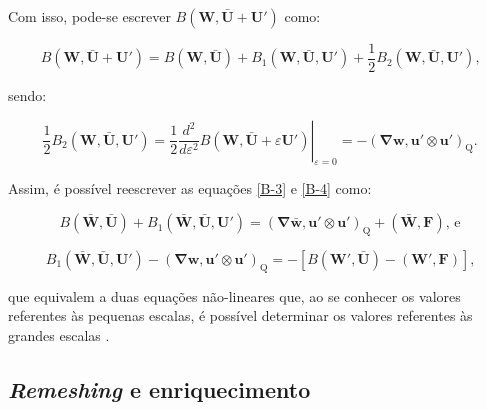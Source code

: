 \documentclass[_ArquivoPrincipal.tex]{subfiles}
\begin{document}
Com isso, pode-se escrever $B(\mathbf{W},\bar{\mathbf{U}}+\mathbf{U}')$ como:

\begin{equation}
    B(\mathbf{W},\bar{\mathbf{U}}+\mathbf{U}')=B(\mathbf{W},\bar{\mathbf{U}})+B_1(\mathbf{W},\bar{\mathbf{U}},\mathbf{U}')+\frac{1}{2}B_2(\mathbf{W},\bar{\mathbf{U}},\mathbf{U}')\text{,}
    \label{B-5}
\end{equation}

\noindent sendo:

\begin{equation}
    \frac{1}{2}B_2(\mathbf{W},\bar{\mathbf{U}},\mathbf{U}')=\frac{1}{2}\left.\frac{d^2}{d\varepsilon^2}B(\mathbf{W},\bar{\mathbf{U}}+\varepsilon\mathbf{U}')\right|_{\varepsilon=0}=-(\mathbf{\nabla}\mathbf{w},\mathbf{u}'\otimes\mathbf{u}')_\mathrm{Q}\text{.}
    \label{B_2}
\end{equation}

Assim, é possível reescrever as equações \ref{B-3} e \ref{B-4} como:

\begin{equation}
    B(\bar{\mathbf{W}},\bar{\mathbf{U}})+B_1(\bar{\mathbf{W}},\bar{\mathbf{U}},\mathbf{U}')=(\mathbf{\nabla}\bar{\mathbf{w}},\mathbf{u}'\otimes\mathbf{u}')_\mathrm{Q}+(\bar{\mathbf{W}},\mathbf{F})\text{, e}
    \label{B-6}
\end{equation}

\begin{equation}
    B_1(\bar{\mathbf{W}},\bar{\mathbf{U}},\mathbf{U}')-(\mathbf{\nabla}\mathbf{w},\mathbf{u}'\otimes\mathbf{u}')_\mathrm{Q}=-[B(\mathbf{W}',\bar{\mathbf{U}})-(\mathbf{W}',\mathbf{F})]\text{,}
    \label{B-7}
\end{equation}

\noindent que equivalem a duas equações não-lineares que, ao se conhecer os valores referentes às pequenas escalas, é possível determinar os valores referentes às grandes escalas \cite{hughes2002variational}.

\subsection{\textit{Remeshing} e enriquecimento} \label{ReE}

\end{document}
